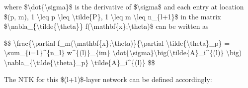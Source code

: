 where \$\textbackslash dot\{\textbackslash sigma\}\$ is the derivative of \$\textbackslash sigma\$ and each entry at location \$(p, m), 1 \textbackslash leq p \textbackslash leq \textbackslash tilde\{P\}, 1 \textbackslash leq m \textbackslash leq n\_\{l+1\}\$ in the matrix \$\textbackslash nabla\_\{\textbackslash tilde\{\textbackslash theta\}\} f(\textbackslash mathbf\{x\};\textbackslash theta)\$ can be written as

\$\$ \textbackslash frac\{\textbackslash partial f\_m(\textbackslash mathbf\{x\};\textbackslash theta)\}\{\textbackslash partial \textbackslash tilde\{\textbackslash theta\}\_p\} = \textbackslash sum\_\{i=1\}\^{}\{n\_l\} w\^{}\{(l)\}\_\{im\} \textbackslash dot\{\textbackslash sigma\}\textbackslash big(\textbackslash tilde\{A\}\_i\^{}\{(l)\} \textbackslash big) \textbackslash nabla\_\{\textbackslash tilde\{\textbackslash theta\}\_p\} \textbackslash tilde\{A\}\_i\^{}\{(l)\} \$\$

The NTK for this \$(l+1)\$-layer network can be defined accordingly:

